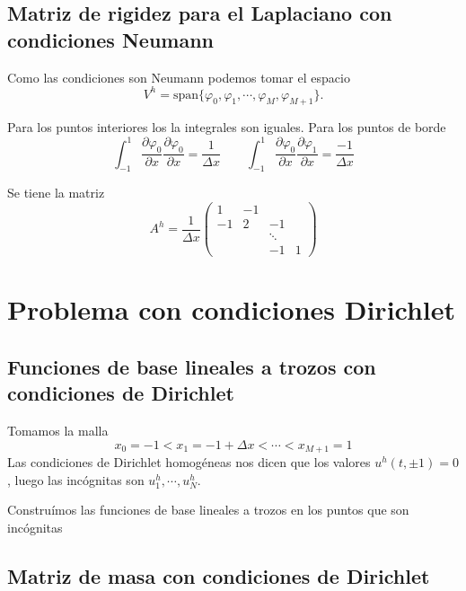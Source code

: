 \subsection{Matriz de rigidez para el Laplaciano con condiciones Neumann
}\label{matriz-de-rigidez-para-el-laplaciano-con-condiciones-neumann-scrollable}

Como las condiciones son Neumann podemos tomar el espacio \[
    V^h = \mathrm{span} \{ \varphi_0, \varphi_1, \cdots, \varphi_M, \varphi_{M+1} \}.
\]



Para los puntos interiores los la integrales son iguales. Para los
puntos de borde \[
    \int_{-1}^1 \frac{\partial \varphi_0}{\partial x}\frac{\partial \varphi_0}{\partial x} = \frac 1 {\Delta x} \qquad \int_{-1}^1 \frac{\partial \varphi_0}{\partial x}\frac{\partial \varphi_1}{\partial x} = \frac {-1} {\Delta x}
\]



Se tiene la matriz \[
    A^h = \frac{1}{\Delta x}
    \begin{pmatrix}
        1  & - 1 &            \\
        -1 & 2   & -1         \\
           &     & \ddots     \\
           &     & -1     & 1
    \end{pmatrix}
\]

\section{Problema con condiciones
  Dirichlet}\label{problema-con-condiciones-dirichlet}

\subsection{Funciones de base lineales a trozos con condiciones de
    Dirichlet}\label{funciones-de-base-lineales-a-trozos-con-condiciones-de-dirichlet}

Tomamos la malla \[
    x_0 = -1 < x_1 = -1+\Delta x < \cdots < x_{M+1} = 1
\] Las condiciones de Dirichlet homogéneas nos dicen que los valores
\(u^h(t,\pm 1)=0\), luego las incógnitas son \(u_1^h, \cdots, u_N^h\).



Construímos las funciones de base lineales a trozos en los puntos que
son incógnitas

\subsection{Matriz de masa con condiciones de
    Dirichlet}\label{matriz-de-masa-con-condiciones-de-dirichlet}

